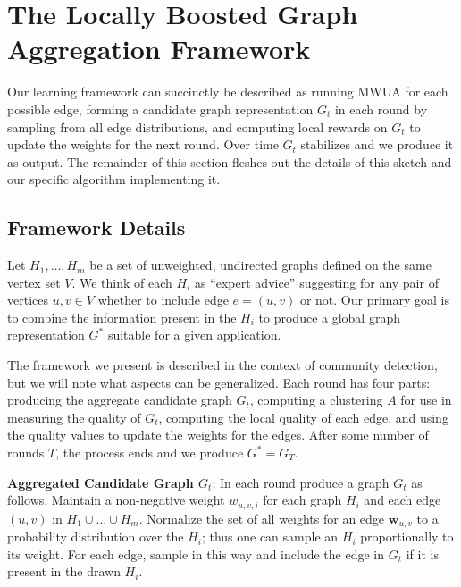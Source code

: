 \documentclass[twoside,twocolumn]{article}
\begin{document}


\section{The Locally Boosted Graph Aggregation Framework}
\label{sec:lbga}

Our learning framework can succinctly be described as running MWUA for each
possible edge, forming a candidate graph representation $G_t$ in each round by
sampling from all edge distributions, and computing local rewards on $G_t$ to
update the weights for the next round. Over time $G_t$ stabilizes and we
produce it as output. The remainder of this section fleshes out the details of
this sketch and our specific algorithm implementing it.  

\subsection{Framework Details}
\label{sec:framework}

Let $H_1, \dots, H_m$ be a set of unweighted, undirected graphs defined on the
same vertex set $V$. We think of each $H_i$ as ``expert advice'' suggesting for
any pair of vertices $u,v \in V$ whether to include edge $e=(u,v)$ or not.
Our primary goal is to combine the information present in the $H_i$ to produce
a global graph representation $G^*$ suitable for a given application. 

The framework we present is described in the context of community detection,
but we will note what aspects can be generalized.  Each round has four parts:
producing the aggregate candidate graph $G_t$, computing a clustering $A$ for
use in measuring the quality of $G_t$, computing the local quality of each
edge, and using the quality values to update the weights for the edges. After
some number of rounds $T$, the process ends and we produce $G^* = G_T$.

\textbf{Aggregated Candidate Graph $G_t$}: In each round produce a graph $G_t$
as follows. Maintain a non-negative weight $w_{u,v,i}$ for each graph $H_i$ and
each edge $(u,v)$ in $H_1 \cup \dots \cup H_m$. Normalize the set of all
weights for an edge $\mathbf{w}_{u,v}$ to a probability distribution over the
$H_i$; thus one can sample an $H_i$ proportionally to its weight. For each
edge, sample in this way and include the edge in $G_t$ if it is present in the
drawn $H_i$. 
\end{document}
